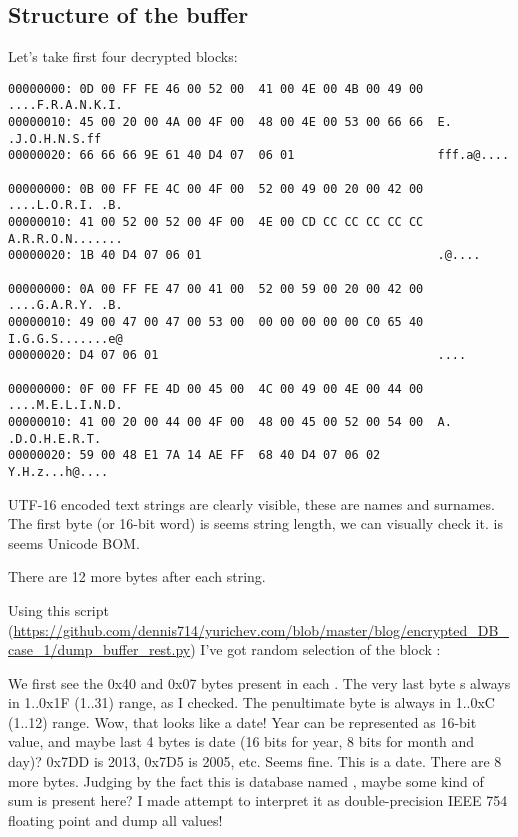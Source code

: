 \subsection{Structure of the buffer}

Let's take first four decrypted blocks:

\begin{lstlisting}
00000000: 0D 00 FF FE 46 00 52 00  41 00 4E 00 4B 00 49 00  ....F.R.A.N.K.I.
00000010: 45 00 20 00 4A 00 4F 00  48 00 4E 00 53 00 66 66  E. .J.O.H.N.S.ff
00000020: 66 66 66 9E 61 40 D4 07  06 01                    fff.a@....

00000000: 0B 00 FF FE 4C 00 4F 00  52 00 49 00 20 00 42 00  ....L.O.R.I. .B.
00000010: 41 00 52 00 52 00 4F 00  4E 00 CD CC CC CC CC CC  A.R.R.O.N.......
00000020: 1B 40 D4 07 06 01                                 .@....

00000000: 0A 00 FF FE 47 00 41 00  52 00 59 00 20 00 42 00  ....G.A.R.Y. .B.
00000010: 49 00 47 00 47 00 53 00  00 00 00 00 00 C0 65 40  I.G.G.S.......e@
00000020: D4 07 06 01                                       ....

00000000: 0F 00 FF FE 4D 00 45 00  4C 00 49 00 4E 00 44 00  ....M.E.L.I.N.D.
00000010: 41 00 20 00 44 00 4F 00  48 00 45 00 52 00 54 00  A. .D.O.H.E.R.T.
00000020: 59 00 48 E1 7A 14 AE FF  68 40 D4 07 06 02        Y.H.z...h@....
\end{lstlisting}

UTF-16 encoded text strings are clearly visible, these are names and surnames.
The first byte (or 16-bit word) is seems string length, we can visually check it.
 is seems Unicode \ac{BOM}.

There are 12 more bytes after each string.

Using this script 
(\url{https://github.com/dennis714/yurichev.com/blob/master/blog/encrypted_DB_case_1/dump_buffer_rest.py})
I've got random selection of the block :



We first see the 0x40 and 0x07 bytes present in each .
The very last byte s always in 1..0x1F (1..31) range, as I checked.
The penultimate byte is always in 1..0xC (1..12) range.
Wow, that looks like a date!
Year can be represented as 16-bit value, and maybe last 4 bytes is date (16 bits for year, 8 bits
for month and day)?
0x7DD is 2013, 0x7D5 is 2005, etc. Seems fine. This is a date.
There are 8 more bytes.
Judging by the fact this is database named , maybe some kind of sum is present here?
I made attempt to interpret it as double-precision IEEE 754 floating point and dump all values!

